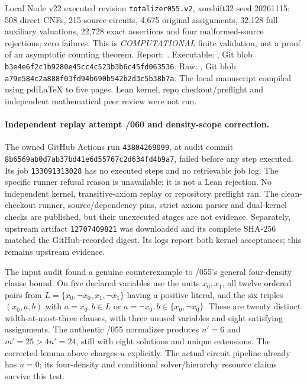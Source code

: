 \documentclass[11pt]{article}
\begin{document}
Local Node v22 executed revision \texttt{totalizer055.v2}, xorshift32 seed
20261115: 508 direct CNFs, 215 source circuits, 4,675 original assignments,
32,128 full auxiliary valuations, 22,728 exact assertions and four
malformed-source rejections; zero failures. This is \emph{COMPUTATIONAL}
finite validation, not a proof of an asymptotic counting theorem.
Report: .
Executable: ,
Git blob \texttt{b3e4e6f2c1b9280e45cc4c523b3b6c45fd063536}.
Raw: ,
Git blob \texttt{a79e584c2a888f03fd94b690b542b2d3c5b38b7a}.
The local manuscript compiled using pdfLaTeX to five pages. Lean kernel,
repo checkout/preflight and independent mathematical peer review were not run.


\paragraph{Independent replay attempt /060 and density-scope correction.}
The owned GitHub Actions run \texttt{43804269099}, at audit commit
\texttt{8b6569ab0d7ab37bd41e6d55767c2d634fd4b9a7}, failed before
any step executed. Its job \texttt{133091313028} has no executed steps
and no retrievable job log. The specific runner refusal reason is
unavailable; it is not a Lean rejection. No independent kernel,
transitive-axiom replay or repository preflight ran. The clean-checkout
runner, source/dependency pins, strict axiom parser and dual-kernel
checks are published, but their unexecuted stages are not evidence.
Separately, upstream artifact \texttt{12707409821} was downloaded and
its complete SHA-256 matched the GitHub-recorded digest. Its logs
report both kernel acceptances; this remains upstream evidence.

The input audit found a genuine counterexample to /055's general
four-density clause bound. On five declared variables use the units
$x_0,x_1$, all twelve ordered pairs from
$L=\{x_0,\neg x_0,x_1,\neg x_1\}$ having a positive literal,
and the six triples $(x_0,a,b)$ with $a=x_0,b\in L$ or
$a=\neg x_0,b\in\{x_0,\neg x_0\}$. These are twenty distinct
width-at-most-three clauses, with three unused variables and eight
satisfying assignments. The authentic /055 normalizer produces
$n'=6$ and $m'=25>4n'=24$, still with eight solutions and unique
extensions. The corrected lemma above charges $u$ explicitly.
The actual circuit pipeline already has $u=0$; its four-density
and conditional solver/hierarchy resource claims survive this test.
\end{document}
